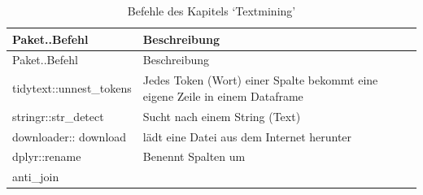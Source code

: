\documentclass[12pt,ngerman,]{book}
\theoremstyle{definition}
\theoremstyle{definition}
\theoremstyle{remark}
\begin{document}
\begin{longtable}[]{@{}ll@{}}
\caption{Befehle des Kapitels `Textmining'}\tabularnewline
\toprule
\begin{minipage}[b]{0.34\columnwidth}\raggedright\strut
Paket..Befehl\strut
\end{minipage} & \begin{minipage}[b]{0.42\columnwidth}\raggedright\strut
Beschreibung\strut
\end{minipage}\tabularnewline
\midrule
\endfirsthead
\toprule
\begin{minipage}[b]{0.34\columnwidth}\raggedright\strut
Paket..Befehl\strut
\end{minipage} & \begin{minipage}[b]{0.42\columnwidth}\raggedright\strut
Beschreibung\strut
\end{minipage}\tabularnewline
\midrule
\endhead
\begin{minipage}[t]{0.34\columnwidth}\raggedright\strut
tidytext::unnest\_tokens\strut
\end{minipage} & \begin{minipage}[t]{0.42\columnwidth}\raggedright\strut
Jedes Token (Wort) einer Spalte bekommt eine eigene Zeile in einem
Dataframe\strut
\end{minipage}\tabularnewline
\begin{minipage}[t]{0.34\columnwidth}\raggedright\strut
stringr::str\_detect\strut
\end{minipage} & \begin{minipage}[t]{0.42\columnwidth}\raggedright\strut
Sucht nach einem String (Text)\strut
\end{minipage}\tabularnewline
\begin{minipage}[t]{0.34\columnwidth}\raggedright\strut
downloader:: download\strut
\end{minipage} & \begin{minipage}[t]{0.42\columnwidth}\raggedright\strut
lädt eine Datei aus dem Internet herunter\strut
\end{minipage}\tabularnewline
\begin{minipage}[t]{0.34\columnwidth}\raggedright\strut
dplyr::rename\strut
\end{minipage} & \begin{minipage}[t]{0.42\columnwidth}\raggedright\strut
Benennt Spalten um\strut
\end{minipage}\tabularnewline
\begin{minipage}[t]{0.34\columnwidth}\raggedright\strut
anti\_join\strut
\end{minipage} & \begin{minipage}[t]{0.42\columnwidth}\raggedright\strut

\end{minipage}
\end{longtable}
\end{document}
